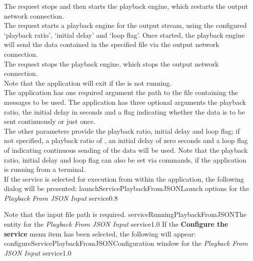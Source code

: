 The  request stops and then
starts the playback engine, which restarts the output \yarp{} network connection.\\

The  request starts a playback
engine for the output stream, using the configured `playback ratio', `initial delay' and
`loop flag'.
Once started, the playback engine will send the data contained in the specified file via
the output \yarp{} network connection.\\

The  request stops the playback
engine, which stops the output \yarp{} network connection.\\

Note that the application will exit if the  is not
running.\\

The application has one required argument \longDash{} the path to the \json{} file
containing the messages to be used.
The application has three optional arguments \longDash{} the playback ratio, the initial
delay in seconds and a flag indicating whether the data is to be sent continuously or just
once.
\insertAppParameters
\condPage
{}
\insertInputServiceComment\\

The other parameters provide the playback ratio, initial delay and loop flag; if not
specified, a playback ratio of , an initial delay of zero seconds and a loop
flag of  \longDash{} indicating continuous sending of the data \longDash{}
will be used.
Note that the playback ratio, initial delay and loop flag can also be set via commands,
if the application is running from a terminal.\\

\insertStandardServiceCommands
\condPage{}
If the service is selected for execution from within the \emph{\MMMU} application, the
following dialog will be presented:
%
{launchServicePlaybackFromJSON}{Launch options for the \emph{Playback From JSON Input}
service}{0.8}

Note that the input file path is required.
%
{serviceRunningPlaybackFromJSON}{The \emph{\MMMU} entity for the \emph{Playback From JSON
Input} service}{1.0}
\condPage{}
If the \textbf{Configure the service} menu item has been selected, the following will
appear:
%
{configureServicePlaybackFromJSON}{Configuration window for the \emph{Playback From JSON
Input} service}{1.0}

